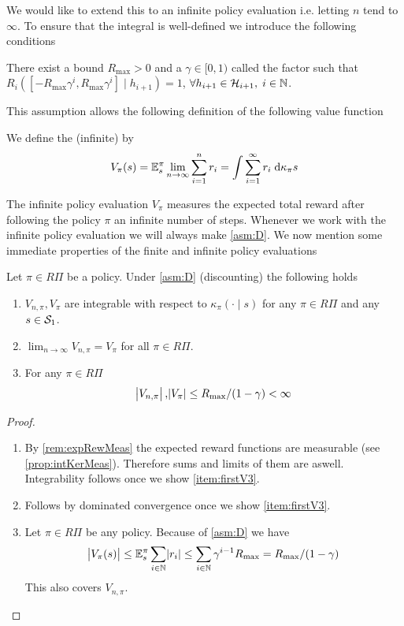 We would like to extend this to an infinite policy evaluation
i.e. letting $n$ tend to $\infty$. To ensure that the integral is well-defined
we introduce the following conditions
\begin{asm}[Discounting] There exist a bound $R_{\max} > 0$ and a
  $\gamma \in [0,1)$ called the  factor such that
  $R_i([-R_{\max} \gamma^i, R_{\max} \gamma^i] \mid h_{i+1}) = 1$,
  $\forall h_{i+1} \in \mathcal{H}_{i+1},\; i \in \mathbb{N}$.
  \label{asm:D}
\end{asm}
This assumption allows the following definition of the following value function
\begin{defn}
  We define the (infinite)  by
  \begin{equation}
    V_\pi(s) = \mathbb{E}_s^\pi \lim_{n \to \infty} \sum_{i=1}^n r_i
    = \int \sum_{i=1}^\infty r_i \; \mathrm{d} \kappa_\pi s
    \label{eq:defInfPolEval}
  \end{equation}
\end{defn}

The infinite policy evaluation $V_\pi$ measures the expected total
reward after following the policy $\pi$ an infinite number of steps.
Whenever we work with the infinite policy evaluation we will
always make \cref{asm:D}.
We now mention some immediate properties of the finite and infinite
policy evaluations
\begin{prop} Let $\pi \in R\Pi$ be a policy.
  Under \cref{asm:D} (discounting) the following holds
  \leavevmode
  \begin{enumerate}
    \item $V_{n,\pi}, V_\pi$ are integrable with respect to
      $\kappa_\pi(\cdot \mid s)$
      for any $\pi \in R\Pi$ and any $s \in \mathcal{S}_1$.
    \item $\lim_{n\to\infty} V_{n, \pi} = V_\pi$
      for all $\pi \in R\Pi$.
    \item For any $\pi \in R\Pi$
      \[\abs{V_{n,\pi}}, \abs{V_\pi} \leq R_{\max} / (1 - \gamma) < \infty\]
      \label{item:firstV3}
  \end{enumerate}
  \label{prop:VpiMeas}
\end{prop}
\vspace{-1cm}
\begin{proof}  
  \leavevmode
  \begin{enumerate}
    \item By \cref{rem:expRewMeas} the expected reward functions
      are measurable (see \cref{prop:intKerMeas}).
      Therefore sums and limits of them are aswell.
      Integrability follows once we show \cref{item:firstV3}.
    \item Follows by dominated convergence once we show \cref{item:firstV3}.
    \item Let $\pi \in R\Pi$ be any policy.
      Because of \cref{asm:D} we have
      \[ \abs{V_\pi(s)} \leq \mathbb{E}_s^\pi \sum_{i \in \mathbb{N}} \abs{r_i}
	\leq \sum_{i \in \mathbb{N}} \gamma^{i-1} R_{\max}
      = R_{\max} / (1-\gamma) \]
      This also covers $V_{n, \pi}$.
  \end{enumerate}
\end{proof}

